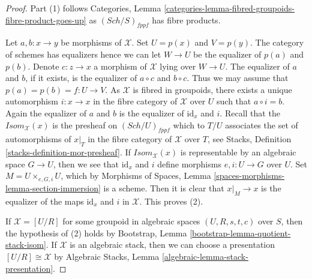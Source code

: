 \documentclass[10pt,a4paper]{amsart}
\theoremstyle{plain}
\theoremstyle{definition}
\theoremstyle{remark}
\numberwithin{equation}{subsection}
\def\Sch{\mathit{Sch}}
\begin{document}
\begin{proof}
Part (1) follows
Categories, Lemma \ref{categories-lemma-fibred-groupoids-fibre-product-goes-up}
as $(\Sch/S)_{fppf}$ has fibre products.

\medskip\noindent
Let $a, b : x \to y$ be morphisms of $\mathcal{X}$.
Set $U = p(x)$ and $V = p(y)$. The category of schemes has equalizers
hence we can let $W \to U$ be the equalizer of $p(a)$ and $p(b)$.
Denote $c : z \to x$ a morphism of $\mathcal{X}$ lying over $W \to U$.
The equalizer of $a$ and $b$, if it exists, is the equalizer of $a \circ c$
and $b \circ c$. Thus we may assume that $p(a) = p(b) = f : U \to V$.
As $\mathcal{X}$ is fibred in groupoids, there exists a unique automorphism
$i : x \to x$ in the fibre category of $\mathcal{X}$ over $U$ such that
$a \circ i = b$. Again the equalizer of $a$ and $b$ is the equalizer
of $\text{id}_x$ and $i$. Recall that the $\mathit{Isom}_\mathcal{X}(x)$
is the presheaf on $(\Sch/U)_{fppf}$ which to
$T/U$ associates the set of automorphisms of $x|_T$ in the fibre category
of $\mathcal{X}$ over $T$, see
Stacks, Definition \ref{stacks-definition-mor-presheaf}.
If $\mathit{Isom}_\mathcal{X}(x)$ is representable by an algebraic space
$G \to U$, then we see that $\text{id}_x$ and $i$ define morphisms
$e, i : U \to G$ over $U$. Set $M = U \times_{e, G, i} U$, which by
Morphisms of Spaces, Lemma \ref{spaces-morphisms-lemma-section-immersion}
is a scheme. Then it is clear that $x|_M \to x$ is the equalizer of
the maps $\text{id}_x$ and $i$ in $\mathcal{X}$.
This proves (2).

\medskip\noindent
If $\mathcal{X} = [U/R]$ for some groupoid in algebraic spaces
$(U, R, s, t, c)$ over $S$, then the hypothesis of (2) holds by
Bootstrap, Lemma \ref{bootstrap-lemma-quotient-stack-isom}.
If $\mathcal{X}$ is an algebraic stack, then we can choose a
presentation $[U/R] \cong \mathcal{X}$ by
Algebraic Stacks, Lemma \ref{algebraic-lemma-stack-presentation}.
\end{proof}
\end{document}
